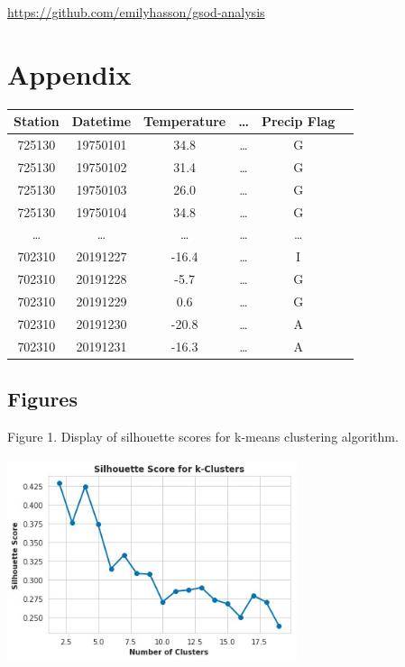 \documentclass[conference]{IEEEtran}
\begin{document}
\href{https://github.com/emilyhasson/gsod-analysis}{https://github.com/emilyhasson/gsod-analysis}

\section{Appendix}

\begin{table}[h!]
\centering
 \begin{tabular}{||c c c c c c||}
 \hline
  Station& Datetime &Temperature & \dots & Precip Flag \\ [0.5ex]
 \hline\hline
 725130 & 19750101 & 34.8 & \dots & G \\
 725130 & 19750102 & 31.4 & \dots & G \\
 725130 & 19750103 & 26.0 & \dots & G \\
 725130 & 19750104 & 34.8 & \dots & G \\
 \dots & \dots & \dots & \dots & \dots \\
 702310 & 20191227 & -16.4 & \dots & I \\
 702310 & 20191228 & -5.7 & \dots & G \\
 702310 & 20191229 & 0.6 & \dots & G \\
 702310 & 20191230 & -20.8 & \dots & A \\
 702310 & 20191231 & -16.3 & \dots & A \\[1ex]

 \hline
 \end{tabular}
\end{table}

\subsection{Figures}

Figure 1. Display of silhouette scores for k-means clustering algorithm.

\includegraphics[width=8.5cm, height=6cm]{silhouette_scores.jpg}
\end{document}
